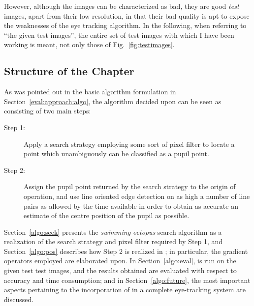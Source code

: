 However, although the images can be characterized as bad, they are
good {\em test\/} images, apart from their low resolution, in that
their bad quality is apt to expose the weaknesses of the eye tracking
algorithm.  In the following, when referring to ``the given test
images'', the entire set of test images with which I have been working
is meant, not only those of Fig.~\ref{fig:testimages}.

\subsection{Structure of the Chapter}
\label{algot:intro:structure}

As was pointed out in the basic algorithm formulation in
Section~\ref{eval:approach:algo}, the algorithm decided upon can be
seen as consisting of two main steps: 
\begin{description}
\item[Step 1:] Apply a search strategy employing some sort of pixel
  filter to locate a point which unambiguously can be classified as a
  pupil point.
\item[Step 2:] Assign the pupil point returned by the search strategy
  to the origin of operation, and use line oriented edge detection on
  as high a number of line pairs as allowed by the time available in
  order to obtain as accurate an estimate of the centre position of
  the pupil as possible.
\end{description}

Section~\ref{algo:seek} presents the {\em swimming octopus\/} search
algorithm as a realization of the search strategy and pixel filter
required by Step 1, and Section~\ref{algo:pos} describes how Step 2 is
realized in {\octopus}; in particular, the gradient operators employed
are elaborated upon.  In Section~\ref{algo:eval}, {\octopus} is run on
the given test test images, and the results obtained are evaluated
with respect to accuracy and time consumption; and in
Section~\ref{algo:future}, the most important aspects pertaining to
the incorporation of {\octopus} in a complete eye-tracking system are
discussed.
